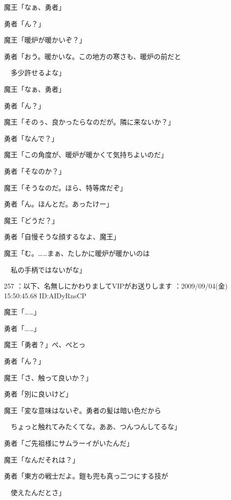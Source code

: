 \documentclass[a4j,twocolumn]{tarticle}
\begin{document}
魔王「なぁ、勇者」\par{} 
勇者「ん？」\par{} 
魔王「暖炉が暖かいぞ？」\par{} 
勇者「おう。暖かいな。この地方の寒さも、暖炉の前だと\par{} 
　多少許せるよな」 



魔王「なぁ、勇者」\par{} 
勇者「ん？」\par{} 
魔王「そのぅ、良かったらなのだが。隣に来ないか？」\par{} 
勇者「なんで？」 



魔王「この角度が、暖炉が暖かくて気持ちよいのだ」\par{} 
勇者「そなのか？」\par{} 
魔王「そうなのだ。ほら、特等席だぞ」 



勇者「ん。ほんとだ。あったけー」\par{} 
魔王「どうだ？」\par{} 
勇者「自慢そうな顔するなよ、魔王」 



魔王「む。……まぁ、たしかに暖炉が暖かいのは\par{} 
　私の手柄ではないがな」 

	
    
    

257 ：以下、名無しにかわりましてVIPがお送りします ：2009/09/04(金) 15:50:45.68 ID:AIDyRnsCP 


魔王「……」\par{} 
勇者「……」 



魔王「勇者？」ぺ、ぺとっ\par{} 
勇者「ん？」 



魔王「さ、触って良いか？」\par{} 
勇者「別に良いけど」 



魔王「変な意味はないぞ。勇者の髪は暗い色だから\par{} 
　ちょっと触れてみたくてな。ああ、つんつんしてるな」 



勇者「ご先祖様にサムラーイがいたんだ」\par{} 
魔王「なんだそれは？」 



勇者「東方の戦士だよ。鎧も兜も真っ二つにする技が\par{} 
　使えたんだとさ」 
\end{document}
